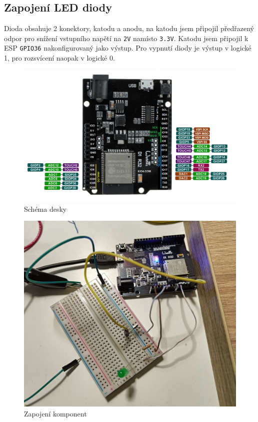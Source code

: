 \documentclass[a4paper, 11pt]{article}
\begin{document}
 \subsection{Zapojení LED diody}
 \label{led_wiring}
 Dioda obsahuje 2 konektory, katodu a anodu, na katodu jsem připojil předřazený odpor pro snížení vstupního napětí na \texttt{2V} namísto \texttt{3.3V}. Katodu jsem připojil k ESP \texttt{GPIO36} nakonfigurovaný jako výstup. Pro vypnutí diody je výstup v logické 1, pro rozsvícení naopak v logické 0.

\begin{figure}[h]
   \centering
    \includegraphics[width=\textwidth]{board.png}
 \caption{Schéma desky}
 \label{fig:Test}
\end{figure}

\begin{figure}[h]
   \centering
    \includegraphics[width=\textwidth]{imp.jpg}
 \caption{Zapojení komponent}
 \label{fig:Test}
\end{figure}
\end{document}
